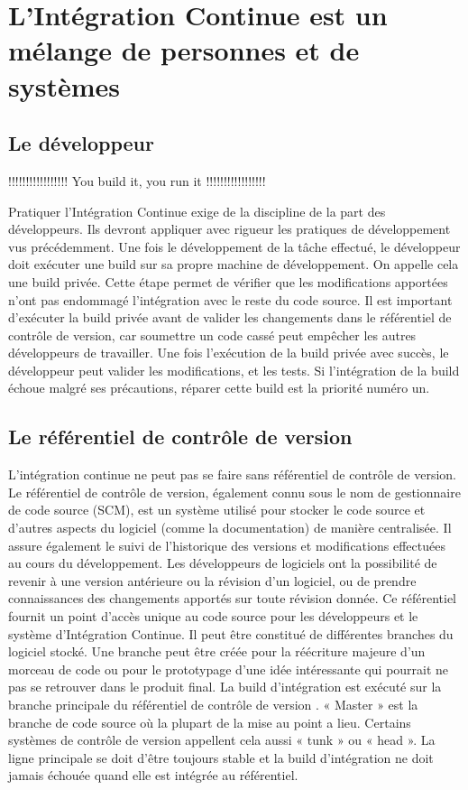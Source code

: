 \documentclass{report}
\begin{document}
    \section{L’Intégration Continue est un mélange de personnes et de systèmes}

      \subsection{Le développeur}
      !!!!!!!!!!!!!!!!! You build it, you run it !!!!!!!!!!!!!!!!!

      Pratiquer l’Intégration Continue exige de la discipline de la part des développeurs. Ils devront appliquer avec rigueur les pratiques de développement vus précédemment. Une fois le développement de la tâche effectué, le développeur doit exécuter une build sur sa propre machine de développement. On appelle cela une build privée. Cette étape permet de vérifier que les modifications apportées n’ont pas endommagé l'intégration avec le reste du code source. Il est important d'exécuter la build privée avant de valider les changements dans le référentiel de contrôle de version, car soumettre un code cassé peut empêcher les autres développeurs de travailler. Une fois l’exécution de la build privée avec succès, le développeur peut valider les modifications, et les tests. Si l'intégration de la build échoue malgré ses précautions, réparer cette build est la priorité numéro un.

      \subsection{Le référentiel de contrôle de version}
      L'intégration continue ne peut pas se faire sans référentiel de contrôle de version. Le référentiel de contrôle de version, également connu sous le nom de gestionnaire de code source (SCM), est un système utilisé pour stocker le code source et d'autres aspects du logiciel (comme la documentation) de manière centralisée. Il assure également le suivi de l'historique des versions et modifications effectuées au cours du développement. Les développeurs de logiciels ont la possibilité de revenir à une version antérieure ou la révision d'un logiciel, ou de prendre connaissances des changements apportés sur toute révision donnée. Ce référentiel fournit un point d'accès unique au code source pour les développeurs et le système d’Intégration Continue. Il peut être constitué de différentes branches du logiciel stocké. Une branche peut être créée pour la réécriture majeure d’un morceau de code ou pour le prototypage d’une idée intéressante qui pourrait ne pas se retrouver dans le produit final. La build d’intégration est exécuté sur la branche principale du référentiel de contrôle de version \cite{Duv07}. « Master » est la branche de code source où la plupart de la mise au point a lieu. Certains systèmes de contrôle de version appellent cela aussi « tunk » ou « head ». La ligne principale se doit d’être toujours stable et la build d’intégration ne doit jamais échouée quand elle est intégrée au référentiel.
\end{document}
